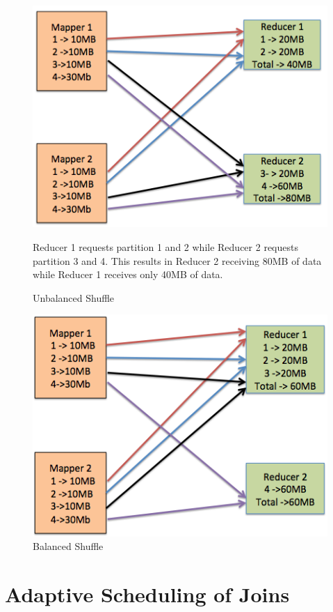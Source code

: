  \begin{figure}[h]
\begin{center}
\includegraphics[scale=1.0]{./img/shuffle_unbalanced.png}
\caption{Unbalanced Shuffle} 
\label{fig:shuffle_unbalanced}
\end{center}
Reducer 1 requests partition 1 and 2 while Reducer 2 requests partition 3 and 4. 
This results in Reducer 2 receiving 80MB of data while Reducer 1 receives only 40MB of data. 
\end{figure}

 \begin{figure}[h]
\begin{center}
\includegraphics[scale=1.0]{./img/shuffle_balanced.png}
\caption{Balanced Shuffle}
\label{fig:shuffle_balanced}
\end{center}
\end{figure}

\section{Adaptive Scheduling of Joins}\label{intro-ch:eeg-overview}

